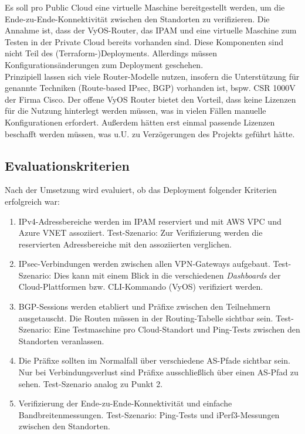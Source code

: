 Es soll pro Public Cloud eine virtuelle Maschine bereitgestellt werden, um die Ende-zu-Ende-Konnektivität zwischen den Standorten zu verifizieren.
Die Annahme ist, dass der VyOS-Router, das \gls{IPAM} und eine virtuelle Maschine zum Testen in der Private Cloud bereits vorhanden sind. Diese Komponenten sind nicht Teil des (Terraform-)Deployments. Allerdings müssen Konfigurationsänderungen zum \gls{Deployment} geschehen.\\
Prinzipiell lassen sich viele Router-Modelle nutzen, insofern die Unterstützung für genannte Techniken (Route-based \gls{IPsec}, \gls{BGP}) vorhanden ist, bspw. CSR 1000V der Firma Cisco\cite{Durai2016}. Der offene VyOS Router bietet den Vorteil, dass keine Lizenzen für die Nutzung hinterlegt werden müssen, was in vielen Fällen manuelle Konfigurationen erfordert. Außerdem hätten erst einmal passende Lizenzen beschafft werden müssen, was u.U. zu Verzögerungen des Projekts geführt hätte.
\subsection{Evaluationskriterien}\label{eval-kriterien-uc1}
Nach der Umsetzung wird evaluiert, ob das \gls{Deployment} folgender Kriterien erfolgreich war:
\begin{enumerate}
    \item IPv4-Adressbereiche werden im \gls{IPAM} reserviert und mit AWS \gls{VPC} und Azure \gls{VNET} assoziiert. Test-Szenario: Zur Verifizierung werden die reservierten Adressbereiche mit den assoziierten verglichen.
    \item \gls{IPsec}-Verbindungen werden zwischen allen \gls{VPN-Gateway}s aufgebaut. Test-Szenario: Dies kann mit einem Blick in die verschiedenen \textit{Dashboards} der Cloud-Plattformen bzw. CLI-Kommando (VyOS) verifiziert werden.
    \item \gls{BGP}-Sessions werden etabliert und Präfixe zwischen den Teilnehmern ausgetauscht. Die Routen müssen in der Routing-Tabelle sichtbar sein. Test-Szenario: Eine Testmaschine pro Cloud-Standort und Ping-Tests zwischen den Standorten veranlassen.
    \item Die Präfixe sollten im Normalfall über verschiedene \gls{AS}-Pfade sichtbar sein. Nur bei Verbindungsverlust sind Präfixe ausschließlich über einen \gls{AS}-Pfad zu sehen. Test-Szenario analog zu Punkt 2.
    \item Verifizierung der Ende-zu-Ende-Konnektivität und einfache Bandbreitenmessungen. Test-Szenario: Ping-Tests und iPerf3-Messungen zwischen den Standorten.
\end{enumerate}
